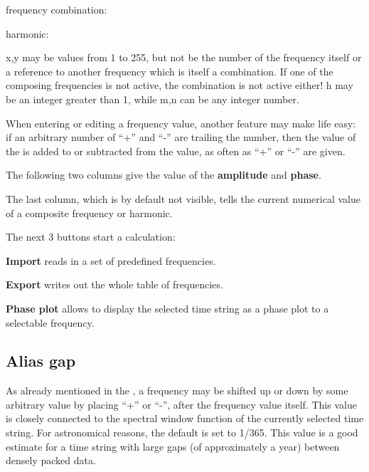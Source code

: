 frequency combination:

harmonic:

x,y may be values from 1 to 255, but not be the number
of the frequency itself or a reference to another frequency
which is itself a combination. If one of the composing 
frequencies is not active, the combination is not active either! 
h may be an integer greater than 1, while m,n can be any integer number.

When entering or editing a frequency value, another feature may make life easy:
if an arbitrary number of ``+'' and ``-'' are trailing the number, then
the value of the 
 is added to or subtracted from
the value, as often as ``+'' or ``-'' are given.

The following two columns give the value of the {\bf amplitude}
and {\bf phase}.

The last column, which is by default not visible, tells
the current numerical value of a composite frequency or harmonic.

The next 3 buttons start a calculation:

{\bf Import}
reads in a set of predefined frequencies.

{\bf Export}
writes out the whole table of frequencies.

{\bf Phase plot}
allows to display the selected time string as a phase plot to
a selectable frequency.

\subsection{Alias gap}%
\label{period.aliasgap}
As already mentioned in the
,
a frequency may be shifted up or down by some arbitrary value by placing
``+'' or ``-'', after the frequency value itself.
This value is closely connected to the
spectral window function of the currently selected time string.
For astronomical reasons, the default is set to 1/365. 
This value is a good estimate for a time string
with large gaps (of approximately a year) between 
densely packed data.

